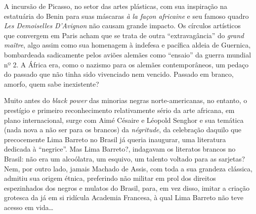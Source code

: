 \documentclass[
  letterpaper,
  DIV=11,
  numbers=noendperiod]{scrreprt}
\begin{document}
A incursão de Picasso, no setor das artes plásticas, com sua inspiração
na estatuária do Benin para suas máscaras \emph{à la façon africaine} e
seu famoso quadro \emph{Les Demoiselles D'Avignon} não causam grande
impacto. Os círculos artísticos que convergem em Paris acham que se
trata de outra ``extravagância'' do \emph{grand maître}, algo assim como
sua homenagem à indefesa e pacífica aldeia de Guernica, bombardeada
sadicamente pelos aviões alemães como ``ensaio'' da guerra mundial nº 2.
A África era, como o nazismo para os alemães contemporâneos, um pedaço
do passado que não tinha sido vivenciado nem vencido. Passado em branco,
amorfo, quem sabe inexistente?

Muito antes do \emph{black power} das minorias negras norte-americanas,
no entanto, o prestígio e primeiro reconhecimento relativamente sério da
arte africana, em plano internacional, surge com Aimé Césaire e Léopold
Senghor e sua temática (nada nova a não ser para os brancos) da
\emph{négritude}, da celebração daquilo que precocemente Lima Barreto no
Brasil já queria inaugurar, uma literatura dedicada à ``negrice''. Mas
Lima Barreto?, indagavam os literatos brancos no Brasil: não era um
alcoólatra, um esquivo, um talento voltado para as sarjetas? Nem, por
outro lado, jamais Machado de Assis, com toda a sua grandeza clássica,
admitiu sua origem étnica, preferindo não militar em prol dos direitos
espezinhados dos negros e mulatos do Brasil, para, em vez disso, imitar
a criação grotesca da já em si ridícula Academia Francesa, à qual Lima
Barreto não teve acesso em vida\ldots{}
\end{document}
